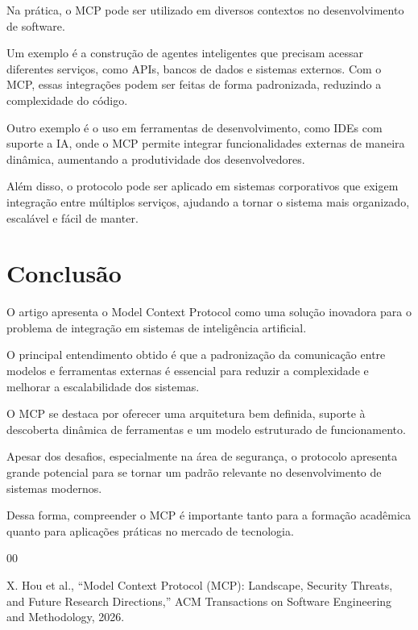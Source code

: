 \documentclass[conference]{IEEEtran}
\begin{document}
Na prática, o MCP pode ser utilizado em diversos contextos no desenvolvimento de software.

Um exemplo é a construção de agentes inteligentes que precisam acessar diferentes serviços, como APIs, bancos de dados e sistemas externos. Com o MCP, essas integrações podem ser feitas de forma padronizada, reduzindo a complexidade do código.

Outro exemplo é o uso em ferramentas de desenvolvimento, como IDEs com suporte a IA, onde o MCP permite integrar funcionalidades externas de maneira dinâmica, aumentando a produtividade dos desenvolvedores.

Além disso, o protocolo pode ser aplicado em sistemas corporativos que exigem integração entre múltiplos serviços, ajudando a tornar o sistema mais organizado, escalável e fácil de manter.

\section{Conclusão}

O artigo apresenta o Model Context Protocol como uma solução inovadora para o problema de integração em sistemas de inteligência artificial.

O principal entendimento obtido é que a padronização da comunicação entre modelos e ferramentas externas é essencial para reduzir a complexidade e melhorar a escalabilidade dos sistemas.

O MCP se destaca por oferecer uma arquitetura bem definida, suporte à descoberta dinâmica de ferramentas e um modelo estruturado de funcionamento.

Apesar dos desafios, especialmente na área de segurança, o protocolo apresenta grande potencial para se tornar um padrão relevante no desenvolvimento de sistemas modernos.

Dessa forma, compreender o MCP é importante tanto para a formação acadêmica quanto para aplicações práticas no mercado de tecnologia.

\begin{thebibliography}{00}

X. Hou et al.,
``Model Context Protocol (MCP): Landscape, Security Threats, and Future Research Directions,''
ACM Transactions on Software Engineering and Methodology, 2026.

\end{thebibliography}
\end{document}
